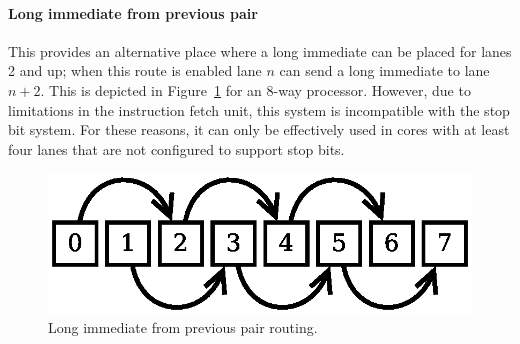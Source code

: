 \paragraph*{Long immediate from previous pair}

This provides an alternative place where a long immediate can be placed for 
lanes 2 and up; when this route is enabled lane $n$ can send a long immediate to 
lane $n+2$. This is depicted in 
Figure~\ref{fig:core-ug-isa-syl-classes-limm-previous} for an 8-way \rvex{} 
processor. However, due to limitations in the instruction fetch unit, this 
system is incompatible with the stop bit system. For these reasons, it can only 
be effectively used in cores with at least four lanes that are not configured 
to support stop bits.

\begin{figure}[h!]
  \centering
  \includegraphics[scale=0.6]{assets/long-immediate-fwding/previous}
  \caption{Long immediate from previous pair routing.}
  \label{fig:core-ug-isa-syl-classes-limm-previous}
\end{figure}

